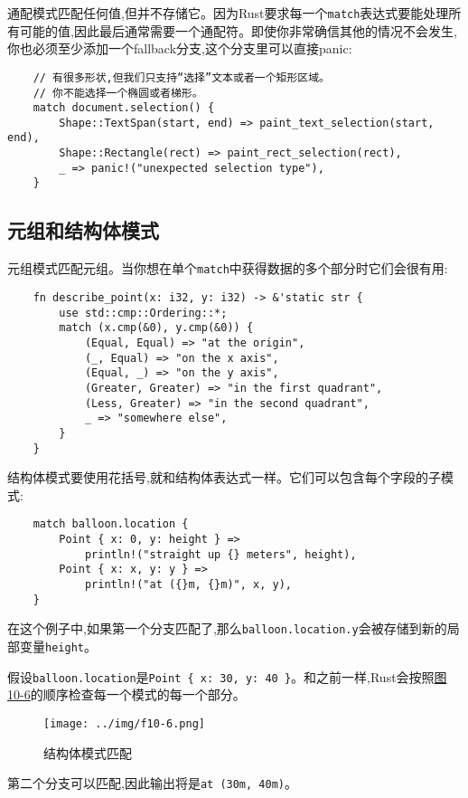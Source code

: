 通配模式匹配任何值,但并不存储它。因为Rust要求每一个\texttt{match}表达式要能处理所有可能的值,因此最后通常需要一个通配符。即使你非常确信其他的情况不会发生,你也必须至少添加一个fallback分支,这个分支里可以直接panic:
\begin{verbatim}
    // 有很多形状,但我们只支持“选择”文本或者一个矩形区域。
    // 你不能选择一个椭圆或者梯形。
    match document.selection() {
        Shape::TextSpan(start, end) => paint_text_selection(start, end),
        Shape::Rectangle(rect) => paint_rect_selection(rect),
        _ => panic!("unexpected selection type"),
    }
\end{verbatim}

\subsection{元组和结构体模式}
元组模式匹配元组。当你想在单个\texttt{match}中获得数据的多个部分时它们会很有用:
\begin{verbatim}
    fn describe_point(x: i32, y: i32) -> &'static str {
        use std::cmp::Ordering::*;
        match (x.cmp(&0), y.cmp(&0)) {
            (Equal, Equal) => "at the origin",
            (_, Equal) => "on the x axis",
            (Equal, _) => "on the y axis",
            (Greater, Greater) => "in the first quadrant",
            (Less, Greater) => "in the second quadrant",
            _ => "somewhere else",
        }
    }
\end{verbatim}

结构体模式要使用花括号,就和结构体表达式一样。它们可以包含每个字段的子模式:
\begin{verbatim}
    match balloon.location {
        Point { x: 0, y: height } =>
            println!("straight up {} meters", height),
        Point { x: x, y: y } =>
            println!("at ({}m, {}m)", x, y),
    }
\end{verbatim}

在这个例子中,如果第一个分支匹配了,那么\texttt{balloon.location.y}会被存储到新的局部变量\texttt{height}。

假设\texttt{balloon.location}是\texttt{Point \{ x: 30, y: 40 \}}。和之前一样,Rust会按照\hyperref[f10-6]{图10-6}的顺序检查每一个模式的每一个部分。

\begin{figure}[htbp]
    \centering
    \texttt{[image: ../img/f10-6.png]}
    \caption{结构体模式匹配}
    \label{f10-6}
\end{figure}

第二个分支可以匹配,因此输出将是\texttt{at (30m, 40m)}。

